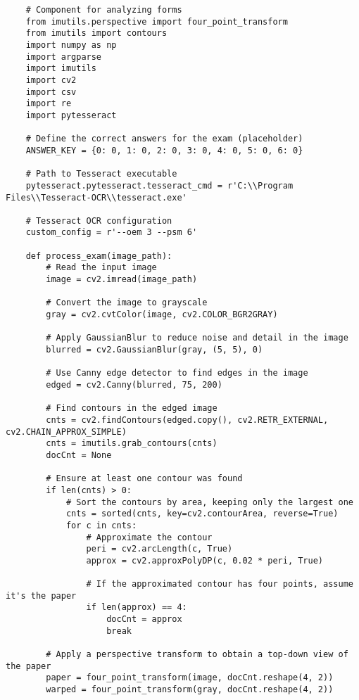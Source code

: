 \begin{lstlisting}
    # Component for analyzing forms
    from imutils.perspective import four_point_transform
    from imutils import contours
    import numpy as np
    import argparse
    import imutils
    import cv2
    import csv
    import re
    import pytesseract
    
    # Define the correct answers for the exam (placeholder)
    ANSWER_KEY = {0: 0, 1: 0, 2: 0, 3: 0, 4: 0, 5: 0, 6: 0}
    
    # Path to Tesseract executable
    pytesseract.pytesseract.tesseract_cmd = r'C:\\Program Files\\Tesseract-OCR\\tesseract.exe'
    
    # Tesseract OCR configuration
    custom_config = r'--oem 3 --psm 6'
    
    def process_exam(image_path):
        # Read the input image
        image = cv2.imread(image_path)
        
        # Convert the image to grayscale
        gray = cv2.cvtColor(image, cv2.COLOR_BGR2GRAY)
        
        # Apply GaussianBlur to reduce noise and detail in the image
        blurred = cv2.GaussianBlur(gray, (5, 5), 0)
        
        # Use Canny edge detector to find edges in the image
        edged = cv2.Canny(blurred, 75, 200)
    
        # Find contours in the edged image
        cnts = cv2.findContours(edged.copy(), cv2.RETR_EXTERNAL, cv2.CHAIN_APPROX_SIMPLE)
        cnts = imutils.grab_contours(cnts)
        docCnt = None
    
        # Ensure at least one contour was found
        if len(cnts) > 0:
            # Sort the contours by area, keeping only the largest one
            cnts = sorted(cnts, key=cv2.contourArea, reverse=True)
            for c in cnts:
                # Approximate the contour
                peri = cv2.arcLength(c, True)
                approx = cv2.approxPolyDP(c, 0.02 * peri, True)
                
                # If the approximated contour has four points, assume it's the paper
                if len(approx) == 4:
                    docCnt = approx
                    break
    
        # Apply a perspective transform to obtain a top-down view of the paper
        paper = four_point_transform(image, docCnt.reshape(4, 2))
        warped = four_point_transform(gray, docCnt.reshape(4, 2))
    

\end{lstlisting}
